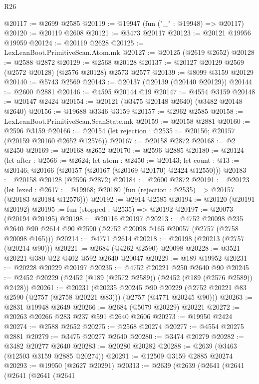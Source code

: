 \begin{lexlean}{R26}
\begin{coremodule}
@20117 := @2699 @2585
@20119 := @19947 (fun ("_" : @19948) => @20117)
@20120 := @20119 @2608
@20121 := @3473 @20117
@20123 := @20121 @19956 @19959
@20124 := @20119 @2628
@20125 := LexLeanBoot.PrimitiveScan.Atom.mk
@20127 := @20125 (@2619 @2652)
@20128 := @2588 @2872
@20129 := @2568 @20128
@20137 := @20127 @20129 @2569 (@2572 @20128) (@2576 @20128) @2573 @2577
@20139 := @8099 @3159 @20129
@20140 := @5743 @2569
@20143 := @20137 (@20139 (@20140 @20129))
@20144 := @2600 @2881
@20146 := @4595 @20144 @19
@20147 := @4554 @3159
@20148 := @20147 @2424
@20154 := @20121 (@3475 @20148 @2640) (@3482 @20148 @2640)
@20156 := @19688 @3346 @3159
@20157 := @2962 @2585
@20158 := LexLeanBoot.PrimitiveScan.ScanState.mk
@20159 := @20158 @2881
@20160 := @2596 @3159
@20166 := @20154 (let rejection : @2535 := @20156; @20157 (@20159 @20160 @2652 @12576))
@20167 := @20158 @2872
@20168 := @2 @2450
@20169 := @20168 @2652
@20170 := @2596 @2885
@20180 := @20124
    (let after : @2566 := @2624;
    let atom : @2450 := @20143;
    let count : @13 := @20146; @20166 (@20157 (@20167 (@20169 @20170) @2424 @12550)))
@20183 := @20158 @20128 (@2596 @2872)
@20184 := @2600 @2872
@20191 := @20123
    (let lexed : @2617 := @19968; @20180 (fun (rejection : @2535) => @20157 (@20183 @20184 @12576)))
@20192 := @2914 @2585
@20194 := @20120 (@20191 @20192)
@20195 := fun (stopped : @2535) => @20192
@20197 := @20073 (@20194 @20195)
@20198 := @20116 @20197
@20213 := @4752
    @20098
    @235
    @2640
    @90
    @2614
    @90
    @2590
    (@2752 @20098 @165 @20057 (@2757 (@2758 @20098 @165)))
@20214 := @4771 @2614
@20218 := @20198 (@20213 (@2757 (@20214 @90)))
@20221 := @2684 (@4262 @2590) @20098
@20228 := @3521 @20221 @380 @22 @402 @592 @2640 @20047
@20229 := @189 @19952
@20231 := @20228 @20229 @20197
@20235 := @4752 @20221 @250 @2640 @90
@20245 := @2452 @20229 (@2452 (@189 (@2572 @2589)) (@2452 (@189 (@2576 @2589)) @2428))
@20261 := @20231
    (@20235
      @20245
      @90
      @20229
      (@2752 @20221 @83 @2590 (@2757 (@2758 @20221 @83)))
      (@2757 (@4771 @20245 @90)))
@20263 := @2831 @19948 @2649
@20266 := @2684 (@5079 @20229) @20221
@20272 := @20263 @20266 @283 @237 @591 @2640 @2606
@20273 := @19950 @2424
@20274 := @2588 @2652
@20275 := @2568 @20274
@20277 := @4554 @20275 @2881
@20279 := @3475 @20277 @2640
@20280 := @3474 @20279
@20282 := @3482 @20277 @2640
@20283 := @20280 @20282
@20288 := @2639 (@3463 (@12503 @3159 @2885 @20274))
@20291 := @12509 @3159 @2885 @20274
@20293 := @19950 (@2627 @20291)
@20313 := @2639
    (@2639
      (@2641
        (@2641
          (@2641
            (@2641
              (@2641

\end{coremodule}
\end{lexlean}
